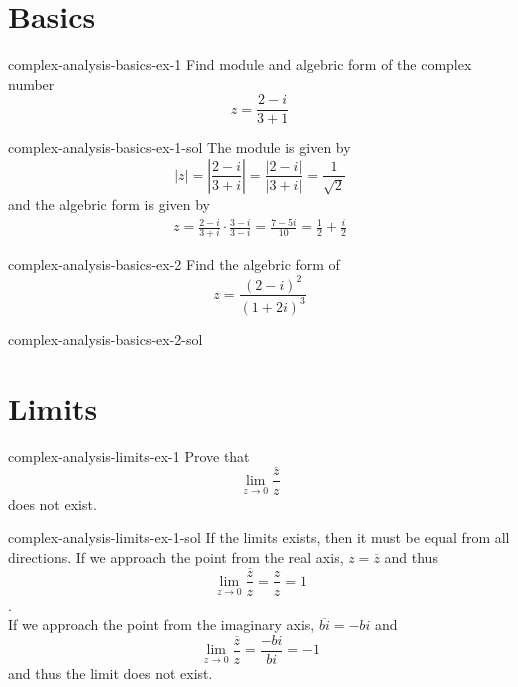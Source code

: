 \documentclass[preview]{standalone}
\begin{document}
\genpage

\section{Basics}

\begin{snippetexercise}{complex-analysis-basics-ex-1}{}
    Find module and algebric form of the complex number 
    \[
        z = \frac{2-i}{3+1}
    \]
\end{snippetexercise}

\begin{snippetsolution}{complex-analysis-basics-ex-1-sol}{}
    The module is given by
    \[
        |z| = \left|\frac{2-i}{3+i}\right| = \frac{|2-i|}{|3+i|}
        = \frac{1}{\sqrt{2}}
    \]
    and the algebric form is given by
    \begin{align*}
        z = \frac{2-i}{3+i} \cdot \frac{3-i}{3-i} = \frac{7-5i}{10}
        = \frac{1}{2} + \frac{i}{2}
    \end{align*}
\end{snippetsolution}

\begin{snippetexercise}{complex-analysis-basics-ex-2}{}
    Find the algebric form of
    \[
        z = \frac{{(2-i)}^2}{{(1+2i)}^3}
    \]
\end{snippetexercise}

\begin{snippetsolution}{complex-analysis-basics-ex-2-sol}{}
    \todo
\end{snippetsolution}

\section{Limits}

\begin{snippetexercise}{complex-analysis-limits-ex-1}{} %
    Prove that \[ \lim_{z \to 0} \dfrac{\overline{z}}{z} \]
    does not exist.
\end{snippetexercise}

\begin{snippetsolution}{complex-analysis-limits-ex-1-sol}{}
    If the limits exists, then it must be equal from all directions.
    If we approach the point from the real axis,
    \(z = \overline{z}\) and thus
    \[ \lim_{z \to 0} \dfrac{\overline{z}}{z} = \frac{z}{z} = 1 \]. \\
    If we approach the point from the imaginary axis,
    \( \overline{bi} = -bi \) and
    \[ \lim_{z \to 0} \dfrac{\overline{z}}{z} = \frac{-bi}{bi} = -1 \]
    and thus the limit does not exist.
\end{snippetsolution}
\end{document}
